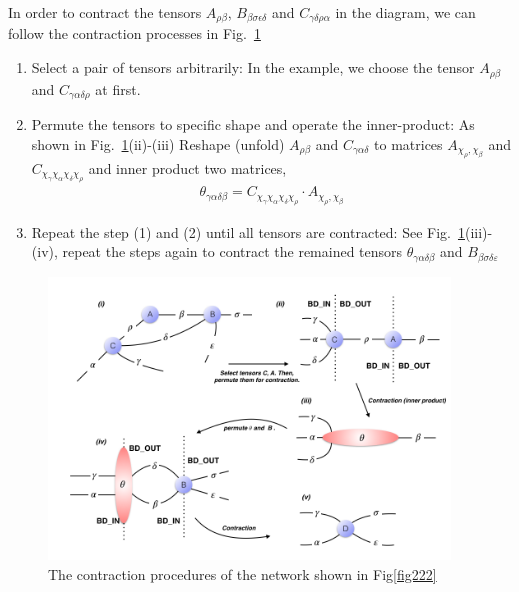 In order to contract the tensors $A_{\rho \beta}$, $B_{\beta \sigma \epsilon \delta}$ and $C_{\gamma \delta \rho \alpha}$ in the diagram, we can follow the contraction processes in Fig.~\ref{fig223}
\begin{enumerate}
	\item Select a pair of tensors arbitrarily: In the example, we choose the tensor $A_{\rho \beta}$ and $C_{\gamma \alpha \delta \rho}$ at first. 
	\item Permute the tensors to specific shape and operate the inner-product: As shown in Fig.~\ref{fig223}(ii)-(iii) Reshape (unfold) $A_{\rho \beta}$ and $C_{\gamma \alpha \delta}$ to matrices $A_{\chi_{\rho}, \chi_{\beta}}$ and $C_{\chi_{\gamma} \chi_{\alpha} \chi_{\delta} \chi_{\rho}}$ and inner product two matrices, 
		\begin{align}
			\theta_{\gamma \alpha \delta \beta} = C_{\chi_{\gamma} \chi_{\alpha} \chi_{\delta} \chi_{\rho}} \cdot A_{\chi_{\rho}, \chi_{\beta}}
		\end{align}
	\item Repeat the step (1) and (2) until all tensors are contracted: See Fig.~\ref{fig223}(iii)-(iv), repeat the steps again to contract the remained tensors $\theta_{\gamma \alpha \delta \beta}$ and $B_{\beta \sigma \delta \varepsilon}$
\end{enumerate}

\begin{figure}[ht]
	\centering
	\includegraphics[width=0.95\textwidth]{figures/fig223.png}
	\caption[The contraction procedures of the network shown in Fig\ref{fig222}(ii)]{ The contraction procedures of the network shown in Fig\ref{fig222}}
	\label{fig223}
\end{figure}

